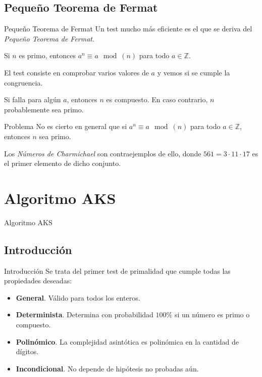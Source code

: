 \documentclass{beamer}
\begin{document}
\subsection{Pequeño Teorema de Fermat}

\begin{frame}{Pequeño Teorema de Fermat}
	\onslide<1->Un test mucho más eficiente es el que se deriva del \textit{Pequeño Teorema de Fermat}.\break
	
	\begin{theorem}
		Si $n$ es primo, entonces $a^n \equiv a \mod(n)$ para todo $a \in \mathbb{Z}$.
	\end{theorem}
	
	El test consiste en comprobar varios valores de $a$ y vemos si se cumple la congruencia.\break
	
	Si falla para algún $a$, entonces $n$ es compuesto. En caso contrario, $n$ probablemente sea primo.
\end{frame}

\begin{frame}{Problema}
	\onslide<1->No es cierto en general que si $a^n \equiv a \mod(n)$ para todo $a \in \mathbb{Z}$, entonces $n$ sea primo.\break
	
	Los \textit{Números de Charmichael} son contraejemplos de ello, donde $561 = 3\cdot11\cdot17$ es el primer elemento de dicho conjunto.
\end{frame}

\section{Algoritmo AKS}

\begin{frame}
	\centering
	\begin{Huge}
		Algoritmo AKS
	\end{Huge}
\end{frame}

\subsection{Introducción}

\begin{frame}{Introducción}
	Se trata del primer test de primalidad que cumple todas las propiedades deseadas:\break
	
	\begin{itemize}[<+(1)->]
		\item \textbf{General}. Válido para todos los enteros.
		
		\item \textbf{Determinista}. Determina con probabilidad $100\%$ si un número es primo o compuesto.
		
		\item \textbf{Polinómico}. La complejidad asintótica es polinómica en la cantidad de dígitos.
		
		\item \textbf{Incondicional}. No depende de hipótesis no probadas aún.
	\end{itemize}
\end{frame}
\end{document}
